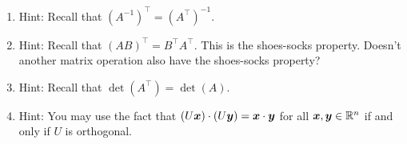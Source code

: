 \begin{enumerate}[!HW!, start=1]
\item Hint: Recall that $(A^{-1})^\top  = (A^\top )^{-1}$. %

\item Hint: Recall that $(AB)^\top  = B^\top A^\top $. This is the shoes-socks property. Doesn't another matrix operation also have the shoes-socks property? %

\item Hint: Recall that $\det(A^\top ) = \det(A)$. %

\item Hint: You may use the fact that $(U\boldsymbol x)\cdot (U\boldsymbol y) = \boldsymbol x\cdot \boldsymbol y$ for all $\boldsymbol x,\boldsymbol y\in \mathbb{R}^n$ if and only if $U$ is orthogonal. %
\end{enumerate}